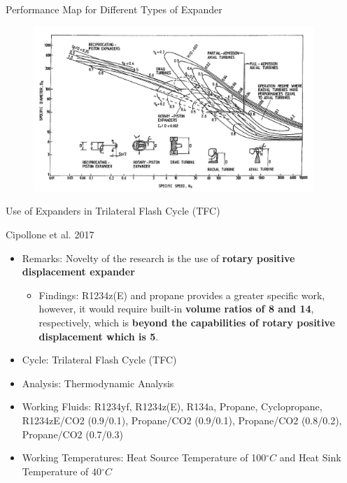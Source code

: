 \begin{frame}{Performance Map for Different Types of Expander\cite{badr1991expansion}}
\begin{figure}
    \centering
    \includegraphics[height=6.25cm]{images/Expander1.png}
    \label{fig:expanderperformancetype}
\end{figure}
\end{frame}

\begin{frame}{Use of Expanders in Trilateral Flash Cycle (TFC)}
    \begin{block}{Cipollone et al. 2017 \cite{cipollone2017low}}
     \begin{itemize}
         \item Remarks: Novelty of the research is the use of \textbf{rotary positive displacement expander}
         \begin{itemize}
             \item Findings: R1234z(E) and propane provides a greater specific work, however, it would require built-in  \textbf{volume ratios of 8 and 14}, respectively, which is \textbf{beyond the capabilities of rotary positive displacement which is 5}.
         \end{itemize}
         \item Cycle: Trilateral Flash Cycle (TFC)
         \item Analysis: Thermodynamic Analysis
         \item Working Fluids: R1234yf, R1234z(E), R134a, Propane, Cyclopropane, R1234zE/CO2 (0.9/0.1), Propane/CO2 (0.9/0.1), Propane/CO2 (0.8/0.2), Propane/CO2 (0.7/0.3)
         \item Working Temperatures: Heat Source Temperature of 100$^{\circ}C$ and Heat Sink Temperature of 40$^{\circ}C$
     \end{itemize}
    \end{block}
\end{frame}

